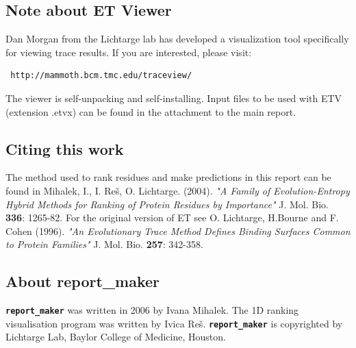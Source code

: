 \subsection{Note about ET Viewer}
 Dan Morgan from the Lichtarge lab has developed a visualization tool specifically for
viewing trace results. If you are interested, please visit:
\begin{verbatim} http://mammoth.bcm.tmc.edu/traceview/ \end{verbatim}
The viewer is self-unpacking and self-installing.
Input files to be used with ETV (extension .etvx) can be found in the attachment to the main report.


\subsection{Citing this work}
The method used to rank residues and make predictions in this report can be found in 
Mihalek, I., I. Re\v{s}, O. Lichtarge. (2004).
\emph {"A Family of Evolution-Entropy Hybrid Methods for Ranking of Protein Residues by Importance" }
J. Mol. Bio. {\bf 336}: 1265-82.
For the original version of ET see
O. Lichtarge, H.Bourne and F. Cohen  (1996).
\emph {"An Evolutionary Trace Method Defines Binding Surfaces Common to Protein Families" }
J. Mol. Bio. {\bf 257}: 342-358.


\subsection{About report\_maker} 
{\tt \bf report\_maker} was written in 2006 by Ivana Mihalek. The 1D ranking visualisation
program was written by Ivica Re\v{s}.
 {\tt \bf report\_maker} is copyrighted by Lichtarge Lab,
Baylor College of Medicine, Houston.

